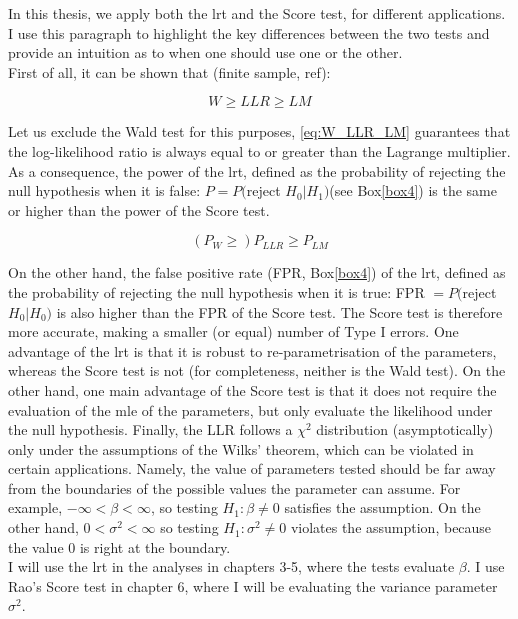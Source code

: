 In this thesis, we apply both the \gls{lrt} and the Score test, for different applications.
I use this paragraph to highlight the key differences between the two tests and provide an intuition as to when one should use one or the other.\\

First of all, it can be shown that (finite sample, ref):

\begin{equation}\label{eq:W_LLR_LM}
    W \geq LLR \geq LM
\end{equation}

Let us exclude the Wald test for this purposes, \eqref{eq:W_LLR_LM} guarantees that the log-likelihood ratio is always equal to or greater than the Lagrange multiplier.
As a consequence, the power  of the \gls{lrt}, defined as the probability of rejecting the null hypothesis when it is false: $P = P($reject $H_0 | H_1)$(see Box\ref{box4}) is the same or higher than the power of the Score test.

\begin{equation}
    (P_W \geq) P_{LLR} \geq P_{LM}
\end{equation}

On the other hand, the false positive rate (FPR, Box\ref{box4}) of the \gls{lrt}, defined as the probability of rejecting the null hypothesis when it is true: FPR $= P($reject $H_0 | H_0)$ is also higher than the FPR of the Score test.
The Score test is therefore more accurate, making a smaller (or equal) number of Type I errors. 
One advantage of the \gls{lrt} is that it is robust to re-parametrisation of the parameters, whereas the Score test is not (for completeness, neither is the Wald test). 
On the other hand, one main advantage of the Score test is that it does not require the evaluation of the \gls{mle} of the parameters, but only evaluate the likelihood under the null hypothesis.
Finally, the LLR follows a $\chi^2$ distribution (asymptotically) only under the assumptions of the Wilks' theorem, which can be violated in certain applications.
Namely, the value of parameters tested should be far away from the boundaries of the possible values the parameter can assume.
For example, $-\infty < \beta < \infty$, so testing $H_1: \beta \neq 0$ satisfies the assumption.
On the other hand, $0 < \sigma^2 < \infty$ so testing $H_1: \sigma^2 \neq 0$ violates the assumption, because the value $0$ is right at the boundary.\\

I will use the \gls{lrt} in the analyses in chapters 3-5, where the tests evaluate $\beta$.
I use Rao's Score test in chapter 6, where I will be evaluating the variance parameter $\sigma^2$.


